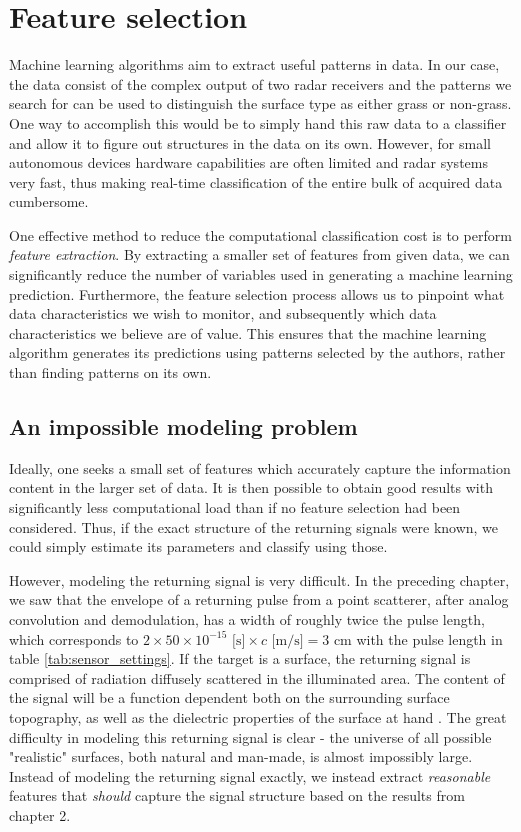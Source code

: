 \chapter{Feature selection}
Machine learning algorithms aim to  extract useful patterns in data. In our case, the data consist of the complex output of two radar receivers and the patterns we search for can be used to distinguish the surface type as either grass or non-grass. One way to accomplish this would be to simply hand this raw data to a classifier and allow it to figure out structures in the data on its own. However, for small autonomous devices hardware capabilities are often limited and radar systems very fast, thus making real-time classification of the entire bulk of acquired data cumbersome.  

One effective method to reduce the computational classification cost is to perform \emph{feature extraction}. By extracting a smaller set of features from given data, we can significantly reduce the number of variables used in generating a machine learning prediction. Furthermore, the feature selection process allows us to pinpoint what data characteristics we wish to monitor, and subsequently which data characteristics we believe are of value. This ensures that the machine learning algorithm generates its predictions using patterns selected by the authors, rather than finding patterns on its own.  


\section{An impossible modeling problem}

Ideally, one seeks a small set of features which accurately capture the information content in the larger set of data. It is then possible to obtain good results with significantly less computational load than if no feature selection had been considered. Thus, if the exact structure of the returning signals were known, we could simply estimate its parameters and classify using those.

However, modeling the returning signal is very difficult. In the preceding chapter, we saw that the envelope of a returning pulse from a point scatterer, after analog convolution and demodulation, has a width of roughly twice the pulse length, which corresponds to $2\times50\times 10^{-15}\text{ [s]}\times c \text{ [m/s]}= 3$ cm with the pulse length in table \ref{tab:sensor_settings}. If the target is a surface, the returning signal is comprised of radiation diffusely scattered in the illuminated area. The content of the signal will be a function dependent both on the surrounding surface topography, as well as the dielectric properties of the surface at hand \citep{grossman_popovic_chamberlin_gordon_novotny_2017}. The great difficulty in modeling this returning signal is clear - the universe of all possible "realistic" surfaces, both natural and man-made, is almost impossibly large. Instead of modeling the returning signal exactly, we instead extract \emph{reasonable} features that \emph{should} capture the signal structure based on the results from chapter 2.  

